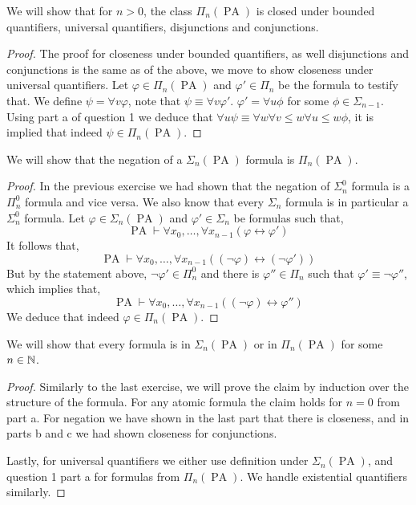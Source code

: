 \subquestion{}
We will show that for $n > 0$, the class $\Pi_n(\operatorname{PA})$ is closed under bounded quantifiers, universal quantifiers, disjunctions and conjunctions.
\begin{proof}
	The proof for closeness under bounded quantifiers, as well disjunctions and conjunctions is the same as of the above, we move to show closeness under universal quantifiers.
	Let $\varphi \in \Pi_n(\operatorname{PA})$ and $\varphi' \in \Pi_n$ be the formula to testify that.
	We define $\psi = \forall v \varphi$, note that $\psi \equiv \forall v \varphi'$.
	$\varphi' = \forall u \phi$ for some $\phi \in \Sigma_{n - 1}$.
	Using part a of question 1 we deduce that $\forall u \psi \equiv \forall w \forall v \le w \forall u \le w \phi$, it is implied that indeed $\psi \in \Pi_n(\operatorname{PA})$.
\end{proof}

\subquestion{}
We will show that the negation of a $\Sigma_n(\operatorname{PA})$ formula is $\Pi_n(\operatorname{PA})$.
\begin{proof}
	In the previous exercise we had shown that the negation of $\Sigma_n^0$ formula is a $\Pi_n^0$ formula and vice versa.
	We also know that every $\Sigma_n$ formula is in particular a $\Sigma_n^0$ formula.
	Let $\varphi \in \Sigma_n(\operatorname{PA})$ and $\varphi' \in \Sigma_n$ be formulas such that,
	\[
		\operatorname{PA} \vdash \forall x_0, \ldots, \forall x_{n - 1} (\varphi \leftrightarrow \varphi')
	\]
	It follows that,
	\[
		\operatorname{PA} \vdash \forall x_0, \ldots, \forall x_{n - 1} ((\lnot \varphi) \leftrightarrow (\lnot \varphi'))
	\]
	But by the statement above, $\lnot \varphi' \in \Pi_n^0$ and there is $\varphi'' \in \Pi_n$ such that $\varphi' \equiv \lnot \varphi''$,
	which implies that,
	\[
		\operatorname{PA} \vdash \forall x_0, \ldots, \forall x_{n - 1} ((\lnot \varphi) \leftrightarrow \varphi'')
	\]
	We deduce that indeed $\varphi \in \Pi_n(\operatorname{PA})$.
\end{proof}

\subquestion{}
We will show that every formula is in $\Sigma_n(\operatorname{PA})$ or in $\Pi_n(\operatorname{PA})$ for some $n \in \mathbb{N}$.
\begin{proof}
	Similarly to the last exercise, we will prove the claim by induction over the structure of the formula.
	For any atomic formula the claim holds for $n = 0$ from part a.
	For negation we have shown in the last part that there is closeness, and in parts b and c we had shown closeness for conjunctions.

	Lastly, for universal quantifiers we either use definition under $\Sigma_n(\operatorname{PA})$, and question 1 part a for formulas from $\Pi_n(\operatorname{PA})$.
	We handle existential quantifiers similarly.
\end{proof}

